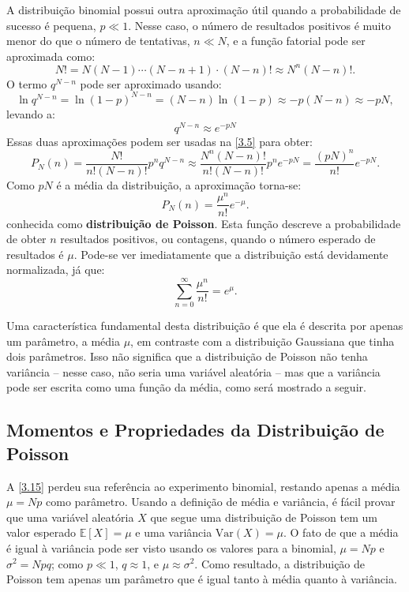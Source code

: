 A distribuição binomial possui outra aproximação útil quando a probabilidade de sucesso é pequena, $p \ll 1$. Nesse caso, o número de resultados positivos é muito menor do que o número de tentativas, $n \ll N$, e a função fatorial pode ser aproximada como:
\begin{equation*}
N! = N (N - 1) \cdots (N - n + 1) \cdot (N - n)! \approx N^n(N - n)!. 
\end{equation*}
O termo $q^{N - n}$ pode ser aproximado usando:
\begin{equation*}
\ln q^{N - n} = \ln(1 - p)^{N - n} = (N - n) \ln(1 - p) \approx - p(N - n) \approx - pN, 
\end{equation*}
levando a:
\begin{equation*}
q^{N - n} \approx e^{- pN}
\end{equation*}
Essas duas aproximações podem ser usadas na \autoref{3.5} para obter:
\begin{equation}
P_N(n) = \dfrac{N!}{n!(N-n)!} p^n q^{N-n} \approx \dfrac{N^n(N - n)!}{n!(N - n)!}p^n e^{- pN} = \dfrac{(pN)^n}{n!}e^{- pN}.
\end{equation}
Como $pN$ é a média da distribuição, a aproximação torna-se:
\begin{equation}\label{3.15}
P_N(n) = \dfrac{\mu^n}{n!}e^{- \mu}.
\end{equation}
conhecida como \textbf{distribuição de Poisson}. Esta função descreve a probabilidade de obter $n$ resultados positivos, ou contagens, quando o número esperado de resultados é $\mu$. Pode-se ver imediatamente que a distribuição está devidamente normalizada, já que:
\begin{equation*}
\sum_{n=0}^{\infty} \dfrac{\mu^n}{n!} = e^\mu. 
\end{equation*}

Uma característica fundamental desta distribuição é que ela é descrita por apenas um parâmetro, a média $\mu$, em contraste com a distribuição Gaussiana que tinha dois parâmetros. Isso não significa que a distribuição de Poisson não tenha variância -- nesse caso, não seria uma variável aleatória -- mas que a variância pode ser escrita como uma função da média, como será mostrado a seguir.

\subsection{Momentos e Propriedades da Distribuição de Poisson}

A \autoref{3.15} perdeu sua referência ao experimento binomial, restando apenas a média $\mu = Np$ como parâmetro. Usando a definição de média e variância, é fácil provar que uma variável aleatória $X$ que segue uma distribuição de Poisson tem um valor esperado $\mathbb{E}[X] = \mu$ e uma variância $\text{Var}(X) = \mu$. O fato de que a média é igual à variância pode ser visto usando os valores para a binomial, $\mu = Np$ e $\sigma^2 = Npq$; como $p \ll 1$, $q \approx 1$, e $\mu \approx \sigma^2$. Como resultado, a distribuição de Poisson tem apenas um parâmetro que é igual tanto à média quanto à variância.

